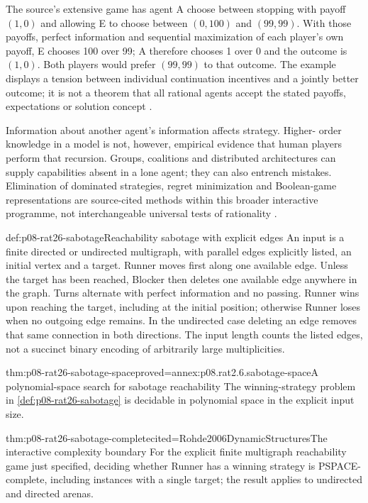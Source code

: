 The source's extensive game has agent A choose between stopping with
payoff \((1,0)\) and allowing E to choose between \((0,100)\) and
\((99,99)\). With those payoffs, perfect information and sequential
maximization of each player's own payoff, E chooses 100 over 99; A
therefore chooses 1 over 0 and the outcome is \((1,0)\). Both players
would prefer \((99,99)\) to that outcome. The example displays a
tension between individual continuation incentives and a jointly better
outcome; it is not a theorem that all rational agents accept the stated
payoffs, expectations or solution concept
\cite[pp.~189--190]{VanBenthemLiuSmets2021Logico}.

Information about another agent's information affects strategy. Higher-
order knowledge in a model is not, however, empirical evidence that
human players perform that recursion. Groups, coalitions and distributed
architectures can supply capabilities absent in a lone agent; they can
also entrench mistakes. Elimination of dominated strategies, regret
minimization and Boolean-game representations are source-cited methods
within this broader interactive programme, not interchangeable universal
tests of rationality \cite[pp.~190--191]{VanBenthemLiuSmets2021Logico}.

\begin{hbdefinition}{def:p08-rat26-sabotage}{Reachability sabotage with explicit edges}
An input is a finite directed or undirected multigraph, with parallel
edges explicitly listed, an initial vertex and a target. Runner moves
first along one available edge. Unless the target has been reached,
Blocker then deletes one available edge anywhere in the graph. Turns
alternate with perfect information and no passing. Runner wins upon
reaching the target, including at the initial position; otherwise Runner
loses when no outgoing edge remains. In the undirected case deleting an
edge removes that same connection in both directions. The input length
counts the listed edges, not a succinct binary encoding of arbitrarily
large multiplicities.
\end{hbdefinition}

\begin{hbtheorem}{thm:p08-rat26-sabotage-space}{proved=annex:p08.rat2.6.sabotage-space}{A polynomial-space search for sabotage reachability}
The winning-strategy problem in \cref{def:p08-rat26-sabotage} is
decidable in polynomial space in the explicit input size.
\end{hbtheorem}

\begin{hbtheorem}{thm:p08-rat26-sabotage-complete}{cited=Rohde2006DynamicStructures}{The interactive complexity boundary}
For the explicit finite multigraph reachability game just specified,
deciding whether Runner has a winning strategy is PSPACE-complete,
including instances with a single target; the result applies to
undirected and directed arenas.
\end{hbtheorem}

